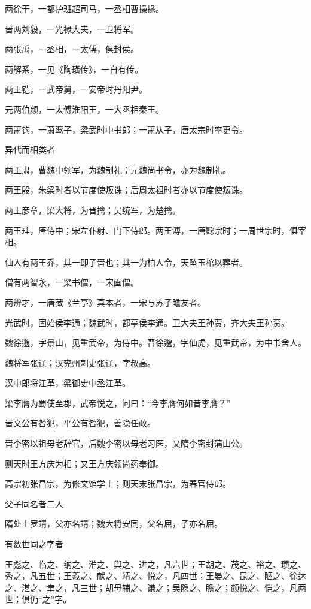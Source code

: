\documentclass[a4paper,12pt,UTF8,twoside]{ctexbook}
\begin{document}
    两徐干，一都护班超司马，一丞相曹操掾。
    
    晋两刘毅，一光禄大夫，一卫将军。
    
    两张禹，一丞相，一太傅，俱封侯。
    
    两解系，一见《陶璜传》，一自有传。
    
    两王铠，一武帝舅，一安帝时丹阳尹。
    
    元两伯颜，一太傅淮阳王，一大丞相秦王。
    
    两萧钧，一萧鸾子，梁武时中书郎；一萧从子，唐太宗时率更令。
    
    异代而相类者
    
    两王肃，曹魏中领军，为魏制礼；元魏尚书令，亦为魏制礼。
    
    两王殷，朱梁时者以节度使叛诛；后周太祖时者亦以节度使叛诛。
    
    两王彦章，梁大将，为晋擒；吴统军，为楚擒。
    
    两王珪，唐侍中；宋左仆射、门下侍郎。两王溥，一唐懿宗时；一周世宗时，俱宰相。
    
    仙人有两王乔，其一即子晋也；其一为柏人令，天坠玉棺以葬者。
    
    僧有两智永，一梁书僧，一宋画僧。
    
    两辨才，一唐藏《兰亭》真本者，一宋与苏子瞻友者。
    
    光武时，固始侯李通；魏武时，都亭侯李通。卫大夫王孙贾，齐大夫王孙贾。
    
    魏徐邈，字景山，见重武帝，为侍中。晋徐邈，字仙虎，见重武帝，为中书舍人。
    
    魏将军张辽；汉兖州刺史张辽，字叔高。
    
    汉中郎将江革，梁御史中丞江革。
    
    梁李膺为蜀使至郡，武帝悦之，问曰：“今李膺何如昔李膺？”
    
    晋文公有咎犯，平公有咎犯，善隐任政。
    
    晋李密以祖母老辞官，后魏李密以母老习医，又隋李密封蒲山公。
    
    则天时王方庆为相；又王方庆领尚药奉御。
    
    高宗初张昌宗，为修文馆学士；则天末张昌宗，为春官侍郎。
    
    父子同名者二人
    
    隋处士罗靖，父亦名靖；魏大将安同，父名屈，子亦名屈。
    
    有数世同之字者
    
    王彪之、临之、纳之、淮之、舆之、进之，凡六世；王胡之、茂之、裕之、瓒之、秀之，凡五世；王羲之、献之、靖之、悦之，凡四世；王晏之、昆之、陋之、徐达之、湛之、聿之，凡三世；胡毋辅之、谦之；吴隐之、瞻之；颜悦之、恺之，凡两世；俱仍“之”字。
    
\end{document}

